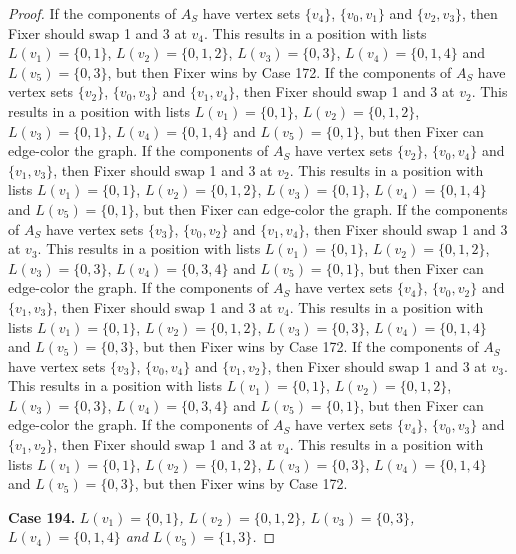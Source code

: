 \documentclass[12pt]{amsart}
\theoremstyle{plain}
\theoremstyle{definition}
\theoremstyle{remark}
\begin{document}
\begin{proof}
If the components of $A_S$ have vertex sets $\{v_4\}$, $\{v_0, v_1\}$ and $\{v_2, v_3\}$, then Fixer should swap 1 and 3 at $v_4$. This results in a position with lists $L(v_1) = \{0, 1\}$, $L(v_2) = \{0, 1, 2\}$, $L(v_3) = \{0, 3\}$, $L(v_4) = \{0, 1, 4\}$ and $L(v_5) = \{0, 3\}$, but then Fixer wins by Case 172.
If the components of $A_S$ have vertex sets $\{v_2\}$, $\{v_0, v_3\}$ and $\{v_1, v_4\}$, then Fixer should swap 1 and 3 at $v_2$. This results in a position with lists $L(v_1) = \{0, 1\}$, $L(v_2) = \{0, 1, 2\}$, $L(v_3) = \{0, 1\}$, $L(v_4) = \{0, 1, 4\}$ and $L(v_5) = \{0, 1\}$, but then Fixer can edge-color the graph.
If the components of $A_S$ have vertex sets $\{v_2\}$, $\{v_0, v_4\}$ and $\{v_1, v_3\}$, then Fixer should swap 1 and 3 at $v_2$. This results in a position with lists $L(v_1) = \{0, 1\}$, $L(v_2) = \{0, 1, 2\}$, $L(v_3) = \{0, 1\}$, $L(v_4) = \{0, 1, 4\}$ and $L(v_5) = \{0, 1\}$, but then Fixer can edge-color the graph.
If the components of $A_S$ have vertex sets $\{v_3\}$, $\{v_0, v_2\}$ and $\{v_1, v_4\}$, then Fixer should swap 1 and 3 at $v_3$. This results in a position with lists $L(v_1) = \{0, 1\}$, $L(v_2) = \{0, 1, 2\}$, $L(v_3) = \{0, 3\}$, $L(v_4) = \{0, 3, 4\}$ and $L(v_5) = \{0, 1\}$, but then Fixer can edge-color the graph.
If the components of $A_S$ have vertex sets $\{v_4\}$, $\{v_0, v_2\}$ and $\{v_1, v_3\}$, then Fixer should swap 1 and 3 at $v_4$. This results in a position with lists $L(v_1) = \{0, 1\}$, $L(v_2) = \{0, 1, 2\}$, $L(v_3) = \{0, 3\}$, $L(v_4) = \{0, 1, 4\}$ and $L(v_5) = \{0, 3\}$, but then Fixer wins by Case 172.
If the components of $A_S$ have vertex sets $\{v_3\}$, $\{v_0, v_4\}$ and $\{v_1, v_2\}$, then Fixer should swap 1 and 3 at $v_3$. This results in a position with lists $L(v_1) = \{0, 1\}$, $L(v_2) = \{0, 1, 2\}$, $L(v_3) = \{0, 3\}$, $L(v_4) = \{0, 3, 4\}$ and $L(v_5) = \{0, 1\}$, but then Fixer can edge-color the graph.
If the components of $A_S$ have vertex sets $\{v_4\}$, $\{v_0, v_3\}$ and $\{v_1, v_2\}$, then Fixer should swap 1 and 3 at $v_4$. This results in a position with lists $L(v_1) = \{0, 1\}$, $L(v_2) = \{0, 1, 2\}$, $L(v_3) = \{0, 3\}$, $L(v_4) = \{0, 1, 4\}$ and $L(v_5) = \{0, 3\}$, but then Fixer wins by Case 172.

\noindent\textbf{Case 194.  }\textit{$L(v_1) = \{0, 1\}$, $L(v_2) = \{0, 1, 2\}$, $L(v_3) = \{0, 3\}$, $L(v_4) = \{0, 1, 4\}$ and $L(v_5) = \{1, 3\}$.}


\end{proof}
\end{document}
